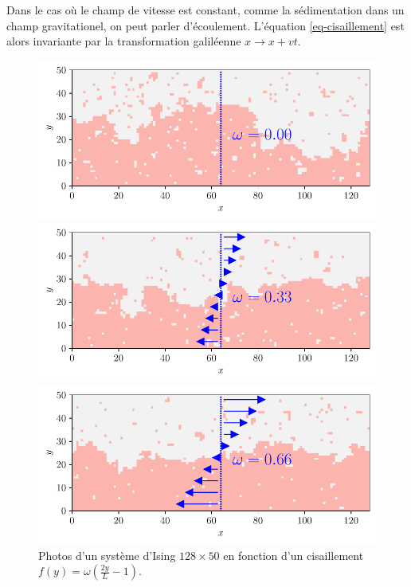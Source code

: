 Dans le cas où le champ de vitesse est constant, comme la sédimentation dans un champ gravitationel, on peut parler d'écoulement. L'équation \ref{eq-cisaillement} est alors invariante par la transformation galiléenne $x \rightarrow x+vt$. 

\begin{figure}
	\begin{minipage}[t]{0.5\linewidth}
		\includegraphics[width=\linewidth]{intro/cis-ising-f-000.pdf}
	\end{minipage}%
	\begin{minipage}[t]{0.5\linewidth}
		\includegraphics[width=\linewidth]{intro/cis-ising-f-033.pdf}
	\end{minipage}
	\centering
	\begin{minipage}[t]{0.5\linewidth}
		\includegraphics[width=\linewidth]{intro/cis-ising-f-066.pdf}
	\end{minipage}
	\caption{Photos d'un système d'Ising $128 \times 50$ en fonction d'un cisaillement
	${f(y) = \omega (\frac{2 y}{L} -1)}$.}
    \label{snap-ising-shear}	
\end{figure}  

